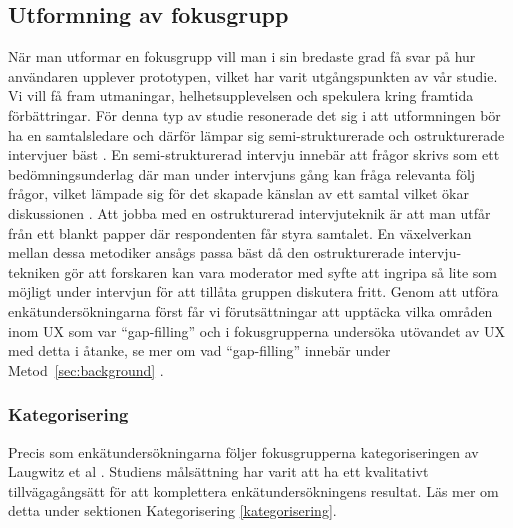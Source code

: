 \subsection{Utformning av fokusgrupp}
När man utformar en fokusgrupp vill man i sin bredaste grad få svar på hur användaren upplever prototypen, vilket har varit utgångspunkten av vår studie. Vi vill få fram utmaningar, helhetsupplevelsen och spekulera kring framtida förbättringar. För denna typ av studie resonerade det sig i att utformningen bör ha en samtalsledare och därför lämpar sig semi-strukturerade och ostrukturerade intervjuer bäst \cite{Denscombe2010TheProjects}. En semi-strukturerad intervju innebär att frågor skrivs som ett bedömningsunderlag där man under intervjuns gång kan fråga relevanta följ frågor, vilket lämpade sig för det skapade känslan av ett samtal vilket ökar  diskussionen \cite{RankinKvalitativaMetoder}. Att jobba med en ostrukturerad intervjuteknik är att man utfår från ett blankt papper där respondenten får styra samtalet\cite{PaUtvarderingsmetodikExperience}. En växelverkan mellan dessa metodiker ansågs passa bäst då den ostrukturerade intervju-tekniken gör att forskaren kan vara moderator med syfte att ingripa så lite som möjligt under intervjun för att tillåta gruppen diskutera fritt. Genom att utföra enkätundersökningarna först får vi förutsättningar att upptäcka vilka områden inom UX som var \enquote{gap-filling} och i fokusgrupperna undersöka utövandet av UX med detta i åtanke, se mer om vad \enquote{gap-filling} innebär under Metod~\ref{sec:background} \cite{Alvesson1985GENERATINGPROBLEMATIZATION}. 
\newline

\subsubsection{Kategorisering}
Precis som enkätundersökningarna följer fokusgrupperna kategoriseringen av Laugwitz et al \cite{Laugwitz2008ConstructionQuestionnaire}. Studiens målsättning har varit att ha ett kvalitativt tillvägagångsätt för att komplettera enkätundersökningens resultat. Läs mer om detta under sektionen Kategorisering \ref{kategorisering}. 
\newline


